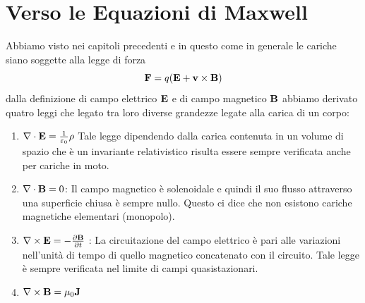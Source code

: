 \section{Verso le Equazioni di Maxwell}

Abbiamo visto nei capitoli precedenti e in questo come in generale le cariche siano soggette alla legge di forza 
\begin{equation*}
	\bold{F} = q ( \bold{E} + \bold{v} \times \bold{B})
\end{equation*}
dalla definizione di campo elettrico $\bold{E}$ e di campo magnetico $\bold{B}$ abbiamo derivato quatro 
leggi che legato tra loro diverse grandezze legate alla carica di un corpo:
\begin{enumerate}
	\item $\nabla \cdot \bold{E} = \frac{1}{\varepsilon_0} \rho$ \quad  {} \newline
	Tale legge dipendendo dalla carica contenuta in un volume di spazio che \`e un invariante relativistico risulta essere sempre verificata anche per cariche in moto.  
	\item $\nabla \cdot \bold{B} = 0 $:
	\newline
	Il campo magnetico \`e solenoidale e quindi il suo flusso attraverso una superficie chiusa \`e sempre nullo. Questo ci dice che non esistono cariche magnetiche elementari (monopolo).
	\item  $\nabla \times \bold{E} = - \frac{\partial \bold{B}}{\partial t}$ \quad {}:
	\newline
	La circuitazione del campo elettrico \`e pari alle variazioni nell'unit\`a di tempo di quello magnetico concatenato con il circuito. Tale legge \`e sempre verificata nel limite di campi quasistazionari. 
	\item  $\nabla \times \bold{B} = \mu_0 \bold{J}$ \quad  {}
\end{enumerate}

